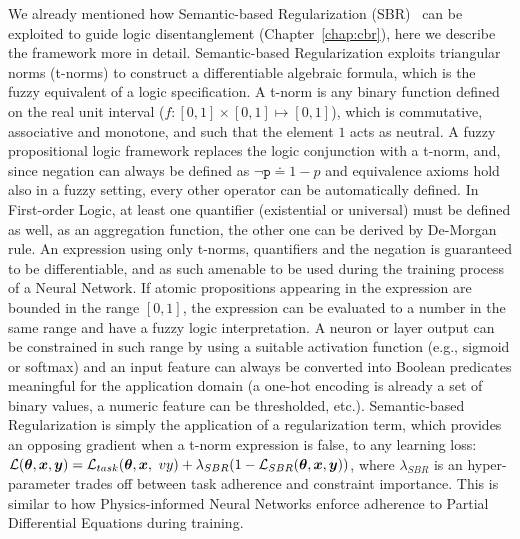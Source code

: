 We already mentioned how Semantic-based Regularization (SBR)~\cite{diligenti2017semantic} can be exploited to guide logic disentanglement (Chapter~\ref{chap:cbr}), here we describe the framework more in detail. Semantic-based Regularization exploits triangular norms (t-norms) to construct a differentiable algebraic formula, which is the fuzzy equivalent of a logic specification. A t-norm is any binary function defined on the real unit interval ($f: [0, 1]\times[0, 1]\mapsto[0, 1]$), which is commutative, associative and monotone, and such that the element $1$ acts as neutral. A fuzzy propositional logic framework replaces the logic conjunction with a t-norm, and, since negation can always be defined as $\neg \texttt{p} \doteq 1 - p$ and equivalence axioms hold also in a fuzzy setting, every other operator can be automatically defined. In First-order Logic, at least one quantifier (existential or universal) must be defined as well, as an aggregation function, the other one can be derived by De-Morgan rule.
An expression using only t-norms, quantifiers and the negation is guaranteed to be differentiable, and as such amenable to be used during the training process of a Neural Network. If atomic propositions appearing in the expression are bounded in the range $[0, 1]$, the expression can be evaluated to a number in the same range and have a fuzzy logic interpretation.
A neuron or layer output can be constrained in such range by using a suitable activation function (e.g., sigmoid or softmax) and an input feature can always be converted into Boolean predicates meaningful for the application domain (a one-hot encoding is already a set of binary values, a numeric feature can be thresholded, etc.).
Semantic-based Regularization is simply the application of a regularization term, which provides an opposing gradient when a t-norm expression is false, to any learning loss: $\gL(\vtheta, \vx, \vy) = \gL_{task}(\vtheta, \vx, \ vy) + \lambda_{SBR} (1 - \gL_{SBR}(\vtheta, \vx, \vy))$, where $\lambda_{SBR}$ is an hyper-parameter trades off between task adherence and constraint importance. This is similar to how Physics-informed Neural Networks enforce adherence to Partial Differential Equations during training.
